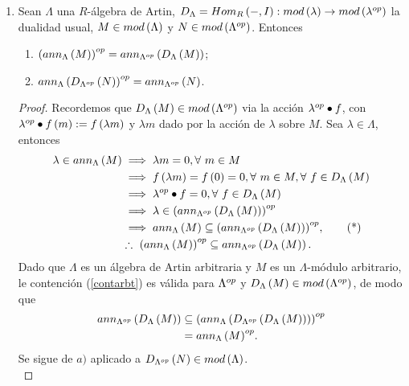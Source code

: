 \documentclass{article}
\begin{document}
\begin{enumerate}[label=\textbf{Ej \arabic*.}]
	\item Sean $\Lambda$ una $R$-álgebra de Artin, $D_{\Lambda}=\functhom{}{I}{R}:mod\lrprth{\lambda}\to mod\lrprth{\opst{\lambda}}$ la dualidad usual, $M\in mod\left(\Lambda\right)$ y $N\in mod\left({\Lambda}^{op}\right)$. Entonces
	\begin{enumerate}
		\item  ${\left(ann_{\Lambda}\left(M\right)\right)}^{op}=ann_{{\Lambda}^{op}}\left(D_{\Lambda}\left(M\right)\right)$;
		\item ${ann_{\Lambda}\left(D_{{\Lambda}^{op}}\left(N\right)\right)}^{op}=ann_{{\Lambda}^{op}}\left(N\right)$.
	\end{enumerate}
	\begin{proof}
		Recordemos que $D_{\Lambda}\left(M\right)\in mod\left({\Lambda}^{op}\right)$ via la acción ${\lambda}^{op}\bullet f$, con ${\lambda}^{op}\bullet f\left(m\right):=f\left(\lambda m\right)$ y $\lambda m$ dado por la acción de $\lambda$ sobre $M$. Sea $\lambda\in\Lambda$, entonces
		\begin{align*}
			\lambda\in ann_{\Lambda}\lrprth{M}&\implies \lambda m=0, \forall\ m\in M\\
			&\implies f\lrprth{\lambda m}=f\lrprth{0}=0,\forall\ m\in M, \forall\ f\in D_{\Lambda}\lrprth{M}\\\
			&\implies \opst{\lambda}\bullet f=0, \forall\ f\in D_{\Lambda}\lrprth{M}\\
			&\implies \lambda\in \opst{\lrprth{ann_{\opst{\Lambda}}\lrprth{D_{\Lambda}\lrprth{M}}}}\\
			&\implies ann_{\Lambda}\lrprth{M}\subseteq \opst{\lrprth{ann_{\opst{\Lambda}}\lrprth{D_{\Lambda}\lrprth{M}}}},\tag{*}\label{contarbt}\\
			&\therefore\ \opst{\lrprth{ann_{\Lambda}\lrprth{M}}}\subseteq ann_{\opst{\Lambda}}\lrprth{D_{\Lambda}\lrprth{M}}.
		\end{align*}
		Dado que $\Lambda$ es un álgebra de Artin arbitraria y $M$ es un $\Lambda$-módulo arbitrario, le contención (\ref{contarbt}) es válida para ${\Lambda}^{op}$ y $D_{\Lambda}\left(M\right)\in mod\left({\Lambda}^{op}\right)$, de modo que
		\begin{align*}
			ann_{{\Lambda}^{op}}\left(D_{\Lambda}\left(M\right)\right)&\subseteq { \left(ann_{\Lambda} \left(D_{ {\Lambda}^{op} } \left(D_{\Lambda} \left(M\right) \right) \right) \right) }^{op}\\
			&={ann_{\Lambda}\left(M\right)}^{op}.
		\end{align*}
		 Se sigue de $a)$ aplicado a $D_{{\Lambda}^{op}}\left(N\right)\in mod\left(\Lambda\right)$.\\
	\end{proof}
	

\end{enumerate}
\end{document}
